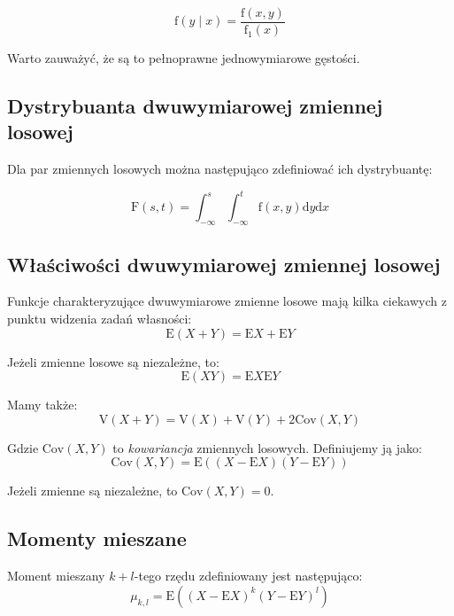 \documentclass[a4paper,12pt]{article}
\begin{document}
\begin{equation}
\textrm{f}\left(y \mid x\right) = \frac{\textrm{f}\left(x, y\right)}{\textrm{f}_1\left(x\right)}  
\end{equation}

Warto zauważyć, że są to pełnoprawne jednowymiarowe gęstości.

\subsection{Dystrybuanta dwuwymiarowej zmiennej losowej}
Dla par zmiennych losowych można następująco zdefiniować ich dystrybuantę:

\begin{equation}
  \textrm{F}\left(s, t\right) = \int_{-\infty}^{s}\int_{-\infty}^{t} \textrm{f}\left(x, y\right)\textrm{d}y\textrm{d}x
\end{equation}

\subsection{Właściwości dwuwymiarowej zmiennej losowej}
Funkcje charakteryzujące dwuwymiarowe zmienne losowe mają kilka ciekawych z punktu widzenia zadań własności:
\begin{equation}
\textrm{E}\left(X + Y\right) = \textrm{E}X + \textrm{E}Y
\end{equation}

Jeżeli zmienne losowe są niezależne, to:
\begin{equation}
\textrm{E}\left(XY\right) = \textrm{E}X\textrm{E}Y
\end{equation}

Mamy także:
\begin{equation}
\textrm{V}\left(X + Y\right) = \textrm{V}\left(X\right) + \textrm{V}\left(Y\right) + 2\textrm{Cov}\left(X, Y\right)
\end{equation}

Gdzie $\textrm{Cov}\left(X, Y\right)$ to \emph{kowariancja} zmiennych losowych. Definiujemy ją jako:
\begin{equation}
  \textrm{Cov}\left(X, Y\right) = \textrm{E}\left(\left(X - \textrm{E}X\right)\left(Y - \textrm{E}Y\right)\right)
\end{equation}

Jeżeli zmienne są niezależne, to $\textrm{Cov}\left(X, Y\right) = 0$.

\subsection{Momenty mieszane}
Moment mieszany $k+l$-tego rzędu zdefiniowany jest następująco:
\begin{equation}
\mu_{k,l} = \textrm{E}\left(\left(X - \textrm{E}X\right)^k\left(Y - \textrm{E}Y\right)^l\right)
\end{equation}
\end{document}
